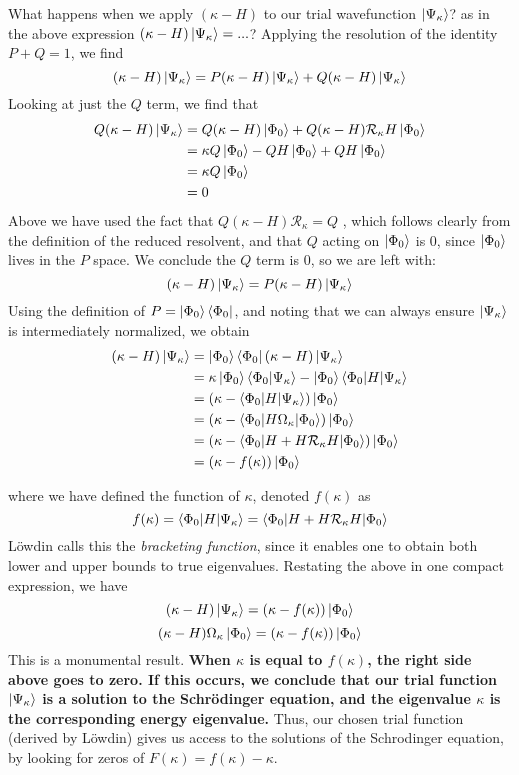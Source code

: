 \documentclass{article}
\begin{document}
What happens when we apply $(\kappa - H)$ to our trial wavefunction $\ket{\Psi_{\kappa}}$? 
as in the above expression $(\kappa - H) \ket{\Psi_{\kappa}} = ... $?
Applying the resolution of the identity $P + Q = 1$, we find
\[ (\kappa - H) \ket{\Psi_{\kappa}} =  P (\kappa - H) \ket{\Psi_{\kappa}} + Q (\kappa - H) \ket{\Psi_{\kappa}}  \]
Looking at just the $Q$ term, we find that
\begin{align*}
Q (\kappa - H) \ket{\Psi_{\kappa}} &= Q (\kappa - H) \ket{\Phi_0} + Q (\kappa - H) \mathcal{R}_{\kappa} H \ket{\Phi_0}  \\
&= \kappa Q \ket{\Phi_0} - Q H \ket{\Phi_0} + Q H \ket{\Phi_0}  \\
&= \kappa Q \ket{\Phi_0}  \\
&= 0
\end{align*}
Above we have used the fact that $ Q (\kappa - H) \mathcal{R}_{\kappa}  = Q$ , which follows
clearly from the definition of the reduced resolvent, and that $Q$ acting on $\ket{\Phi_0}$ is 0, since 
$\ket{\Phi_0}$ lives in the $P$ space. 
We conclude the $Q$ term is 0, so we are left with:
\[ (\kappa - H) \ket{\Psi_{\kappa}} =  P (\kappa - H) \ket{\Psi_{\kappa}} \]
Using the definition of $P = \ket{\Phi_0}\bra{\Phi_0}$, and noting that we can always ensure $\ket{\Psi_\kappa}$ is intermediately normalized, we obtain
\begin{align*}
 (\kappa - H) \ket{\Psi_{\kappa}} &=  \ket{\Phi_0}\bra{\Phi_0} (\kappa - H) \ket{\Psi_{\kappa}} \\
 &=  \kappa \ket{\Phi_0} \braket{\Phi_0|\Psi_\kappa} - \ket{\Phi_0} \braket{\Phi_0| H | \Psi_\kappa} \\
 &= (\kappa - \braket{\Phi_0 | H | \Psi_\kappa}) \ket{\Phi_0} \\
 &= (\kappa - \braket{\Phi_0 | H \Omega_\kappa | \Phi_0}) \ket{\Phi_0} \\
 &= (\kappa - \braket{\Phi_0 | H + H \mathcal{R}_\kappa H  | \Phi_0} ) \ket{\Phi_0} \\
 &= (\kappa - f(\kappa)) \ket{\Phi_0}
\end{align*}

where we have defined the function of $\kappa$, denoted  $f(\kappa)$ as
\[ f(\kappa) =  \braket{\Phi_0 | H | \Psi_\kappa} = \braket{\Phi_0 | H + H \mathcal{R}_\kappa H  | \Phi_0}\]
L{\"o}wdin calls this the \textit{bracketing function}, since it enables one to obtain both lower and upper bounds to true eigenvalues.
Restating the above in one compact expression, we have 
\[ (\kappa - H) \ket{\Psi_{\kappa}} = (\kappa - f(\kappa)) \ket{\Phi_0} \]
\[ (\kappa - H) \Omega_\kappa \ket{\Phi_0} = (\kappa - f(\kappa)) \ket{\Phi_0} \]
This is a monumental result.
\textbf{When $\kappa$ is equal to $f(\kappa)$, the right side above goes to zero. If this occurs,
we conclude that our trial function $\ket{\Psi_{\kappa}}$
is a solution to the Schr{\"o}dinger equation, and the eigenvalue $\kappa$ is the corresponding 
energy eigenvalue.}  
Thus, our chosen trial function (derived by L{\"o}wdin) gives us access to the solutions of 
the Schrodinger equation, by looking for zeros of $F(\kappa) = f(\kappa) - \kappa$.
\end{document}
